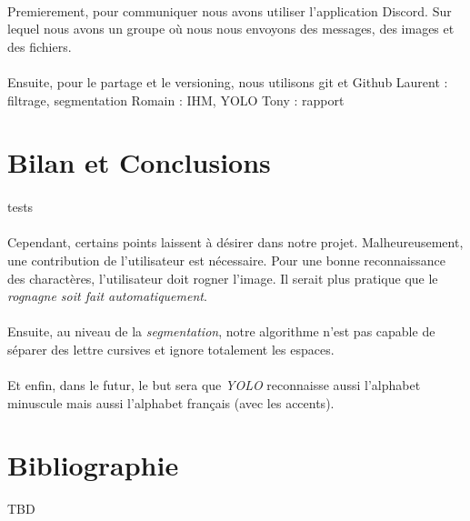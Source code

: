 \documentclass[a4paper]{article}
\begin{document}
		\paragraph{} Premierement, pour communiquer nous avons utiliser l'application Discord. Sur lequel nous avons un groupe où nous nous envoyons des messages, des images et des fichiers.
		\paragraph{} Ensuite, pour le partage et le versioning, nous utilisons git et Github
		Laurent : filtrage, segmentation
		Romain : IHM, YOLO
		Tony : rapport
	\section*{Bilan et Conclusions}%
		\paragraph{}
			tests
		\paragraph{}
			Cependant, certains points laissent à désirer dans notre projet. Malheureusement, une contribution de l'utilisateur est nécessaire. Pour une bonne reconnaissance des charactères, l'utilisateur doit rogner l'image. Il serait plus pratique que le \emph{rognagne soit fait automatiquement}. 
		\paragraph{}
			Ensuite, au niveau de la \emph{segmentation}, notre algorithme n'est pas capable de séparer des lettre cursives et ignore totalement les espaces.
		\paragraph{}
			Et enfin, dans le futur, le but sera que \emph{YOLO} reconnaisse aussi l'alphabet minuscule mais aussi l'alphabet français (avec les accents).
	\newpage
	\section*{Bibliographie}
		TBD
\end{document}
